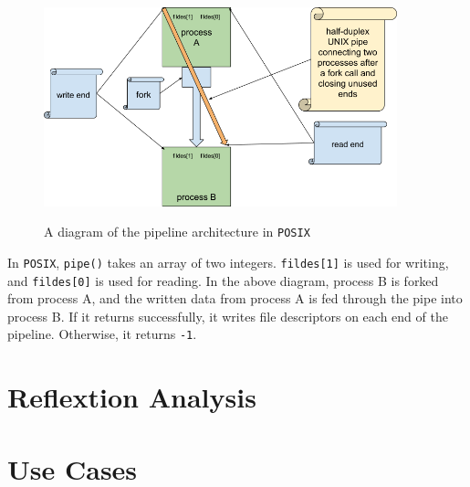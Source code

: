 \documentclass[12pt, dvipsnames, a4paper]{article}
\newcommand{\code}[1]{\texttt{#1}}
\begin{document}
\begin{figure}[hbt!]
	\centering
	\includegraphics[width=290pt]{assets/localipc2.png}
	\caption{A diagram of the pipeline architecture in \code{POSIX}} \cite{rytarowski}
\end{figure}

In \code{POSIX}, \code{pipe()} takes an array of two integers. \code{fildes[1]} is used for writing, and \code{fildes[0]} is used for reading. In the above diagram, process B is forked from process A, and the written data from process A is fed through the pipe into process B. If it returns successfully, it writes file descriptors on each end of the pipeline. Otherwise, it returns \code{-1}.

\section{Reflextion Analysis}

\clearpage
\section{Use Cases}
\end{document}
